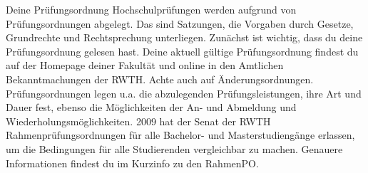 \begin{artikel}{Deine Prüfungsordnung}
Hochschulprüfungen werden aufgrund von Prüfungsordnungen abgelegt. Das sind Satzungen, die Vorgaben durch Gesetze, Grundrechte und Rechtsprechung unterliegen. Zunächst ist wichtig, dass du deine Prüfungsordnung gelesen hast. Deine aktuell gültige Prüfungsordnung findest du auf der Homepage deiner Fakultät und online in den Amtlichen Bekanntmachungen der RWTH. Achte auch auf Änderungsordnungen. Prüfungsordnungen legen u.a. die abzulegenden Prüfungsleistungen, ihre Art und Dauer fest, ebenso die Möglichkeiten der An- und Abmeldung und Wiederholungsmöglichkeiten.
2009 hat der Senat der RWTH Rahmenprüfungsordnungen für alle Bachelor- und Masterstudiengänge erlassen, um die Bedingungen für alle Studierenden vergleichbar zu machen. Genauere Informationen findest du im Kurzinfo zu den RahmenPO.


\end{artikel}
